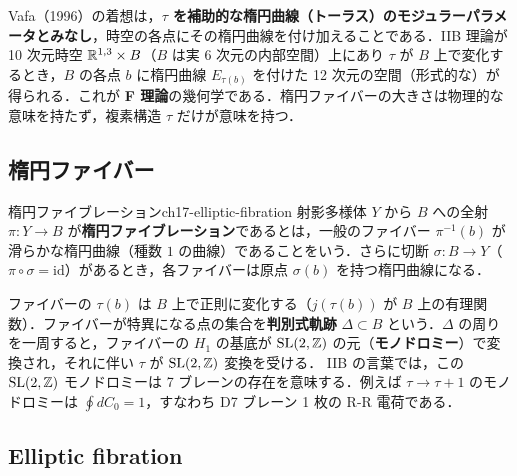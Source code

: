 Vafa（1996）の着想は，\textbf{$\tau$ を補助的な楕円曲線（トーラス）のモジュラーパラメータとみなし}，時空の各点にその楕円曲線を付け加えることである．IIB 理論が 10 次元時空 $\mathbb{R}^{1,3}\times B$（$B$ は実 6 次元の内部空間）上にあり $\tau$ が $B$ 上で変化するとき，$B$ の各点 $b$ に楕円曲線 $E_{\tau(b)}$ を付けた 12 次元の空間（形式的な）が得られる．これが \textbf{F 理論}の幾何学である．楕円ファイバーの大きさは物理的な意味を持たず，複素構造 $\tau$ だけが意味を持つ．

\subsection{楕円ファイバー}

\begin{mydef}{楕円ファイブレーション}{ch17-elliptic-fibration}
射影多様体 $Y$ から $B$ への全射 $\pi:Y\to B$ が\textbf{楕円ファイブレーション}であるとは，一般のファイバー $\pi^{-1}(b)$ が滑らかな楕円曲線（種数 $1$ の曲線）であることをいう．さらに切断 $\sigma:B\to Y$（$\pi\circ\sigma=\mathrm{id}$）があるとき，各ファイバーは原点 $\sigma(b)$ を持つ楕円曲線になる．
\end{mydef}

ファイバーの $\tau(b)$ は $B$ 上で正則に変化する（$j(\tau(b))$ が $B$ 上の有理関数）．ファイバーが特異になる点の集合を\textbf{判別式軌跡} $\Delta\subset B$ という．$\Delta$ の周りを一周すると，ファイバーの $H_1$ の基底が $\operatorname{SL}(2,\mathbb{Z})$ の元（\textbf{モノドロミー}）で変換され，それに伴い $\tau$ が $\operatorname{SL}(2,\mathbb{Z})$ 変換を受ける．
IIB の言葉では，この $\operatorname{SL}(2,\mathbb{Z})$ モノドロミーは 7 ブレーンの存在を意味する．例えば $\tau\to\tau+1$ のモノドロミーは $\oint dC_0=1$，すなわち D7 ブレーン 1 枚の R-R 電荷である．

\subsection{Elliptic fibration}

